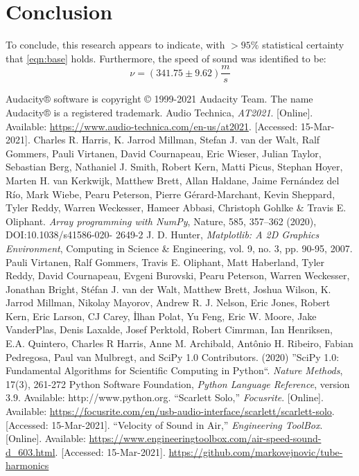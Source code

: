 \documentclass[conference]{IEEEtran}
\begin{document}
\section{Conclusion}

To conclude, this research appears to indicate, with $>95\%$ statistical
certainty that \eqref{eqn:base} holds. Furthermore, the speed of sound was
identified to be:
\begin{equation*}
    \nu = (341.75 \pm 9.62) \si{\frac{m}{s}}
\end{equation*}

\begin{thebibliography}{00}
     Audacity® software is copyright © 1999-2021 Audacity
    Team. The name Audacity® is a registered trademark.
     Audio Technica, \textit{AT2021}. [Online]. Available:
    \url{https://www.audio-technica.com/en-us/at2021}. [Accessed: 15-Mar-2021]. 
     Charles R. Harris, K. Jarrod Millman, Stefan J. van der
    Walt, Ralf Gommers, Pauli Virtanen, David Cournapeau, Eric Wieser, Julian
    Taylor, Sebastian Berg, Nathaniel J. Smith, Robert Kern, Matti Picus,
    Stephan Hoyer, Marten H. van Kerkwijk, Matthew Brett, Allan Haldane, Jaime
    Fernández del Río, Mark Wiebe, Pearu Peterson, Pierre Gérard-Marchant,
    Kevin Sheppard, Tyler Reddy, Warren Weckesser, Hameer Abbasi, Christoph
    Gohlke \& Travis E. Oliphant. \textit{Array programming with NumPy},
    Nature, 585, 357–362 (2020), DOI:10.1038/s41586-020- 2649-2
     J. D. Hunter, \textit{Matplotlib: A 2D Graphics
    Environment}, Computing in Science \& Engineering, vol. 9, no. 3, pp.
    90-95, 2007.
     Pauli Virtanen, Ralf Gommers, Travis E. Oliphant, Matt
    Haberland, Tyler Reddy, David Cournapeau, Evgeni Burovski, Pearu Peterson,
    Warren Weckesser, Jonathan Bright, Stéfan J. van der Walt, Matthew Brett,
    Joshua Wilson, K. Jarrod Millman, Nikolay Mayorov, Andrew R. J. Nelson,
    Eric Jones, Robert Kern, Eric Larson, CJ Carey, İlhan Polat, Yu Feng, Eric
    W. Moore, Jake VanderPlas, Denis Laxalde, Josef Perktold, Robert Cimrman,
    Ian Henriksen, E.A. Quintero, Charles R Harris, Anne M. Archibald, Antônio
    H. Ribeiro, Fabian Pedregosa, Paul van Mulbregt, and SciPy 1.0
    Contributors. (2020) ''SciPy 1.0: Fundamental Algorithms for Scientific
    Computing in Python``. \textit{Nature Methods}, 17(3), 261-272
     Python Software Foundation, \textit{Python Language
    Reference}, version 3.9.  Available: http://www.python.org.
     ``Scarlett Solo,'' \textit{Focusrite}. [Online].
    Available:
    \url{https://focusrite.com/en/usb-audio-interface/scarlett/scarlett-solo}.
    [Accessed: 15-Mar-2021]. 
     ``Velocity of Sound in Air,'' \textit{Engineering
    ToolBox}. [Online].  Available:
    \url{https://www.engineeringtoolbox.com/air-speed-sound-d_603.html}.
    [Accessed: 15-Mar-2021]. 
    \url{https://github.com/markovejnovic/tube-harmonics}
\end{thebibliography}
\end{document}
